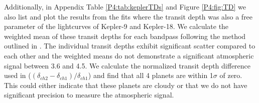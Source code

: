 Additionally, in Appendix Table \ref{P4:tab:keplerTDs} and Figure \ref{P4:fig:TD} we also list and plot the results from the fits where the transit depth was also a free parameter of the lightcurves of Kepler-9 and Kepler-18. We calculate the weighted mean of these transit depths for each bandpass following the method outlined in \citet{Ingalls2016}. The individual transit depths exhibit significant scatter compared to each other and the weighted means do not demonstrate a significant atmospheric signal between 3.6 and 4.5\um. We calculate the normalized transit depth difference used in \citet{Baxter2021} ($(\delta_{ch2} - \delta_{ch1})/\delta_{ch1}$) and find that all 4 planets are within 1$\sigma$ of zero. This could either indicate that these planets are cloudy or that we do not have significant precision to measure the atmospheric signal.



